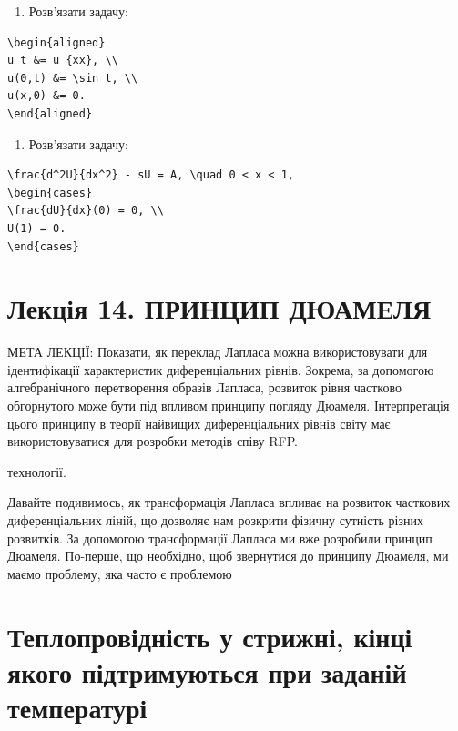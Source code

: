 \documentclass[
  ukrainian,
]{article}
\providecommand{\tightlist}{%
  \setlength{\itemsep}{0pt}\setlength{\parskip}{0pt}}
\begin{document}
\begin{enumerate}
\def\labelenumi{\arabic{enumi}.}
\setcounter{enumi}{2}
\tightlist
\item
  Розв'язати задачу:
\end{enumerate}

\begin{verbatim}
\begin{aligned}
u_t &= u_{xx}, \\
u(0,t) &= \sin t, \\
u(x,0) &= 0.
\end{aligned}
\end{verbatim}

\begin{enumerate}
\def\labelenumi{\arabic{enumi}.}
\setcounter{enumi}{3}
\tightlist
\item
  Розв'язати задачу:
\end{enumerate}

\begin{verbatim}
\frac{d^2U}{dx^2} - sU = A, \quad 0 < x < 1,
\begin{cases}
\frac{dU}{dx}(0) = 0, \\
U(1) = 0.
\end{cases}
\end{verbatim}

\section{Лекція 14. ПРИНЦИП
ДЮАМЕЛЯ}\label{ux43bux435ux43aux446ux456ux44f-14.-ux43fux440ux438ux43dux446ux438ux43f-ux434ux44eux430ux43cux435ux43bux44f}

МЕТА ЛЕКЦІЇ: Показати, як переклад Лапласа можна використовувати для
ідентифікації характеристик диференціальних рівнів. Зокрема, за
допомогою алгебранічного перетворення образів Лапласа, розвиток рівня
частково обгорнутого може бути під впливом принципу погляду Дюамеля.
Інтерпретація цього принципу в теорії найвищих диференціальних рівнів
світу має використовуватися для розробки методів співу RFP.

технології.

Давайте подивимось, як трансформація Лапласа впливає на розвиток
часткових диференціальних ліній, що дозволяє нам розкрити фізичну
сутність різних розвитків. За допомогою трансформації Лапласа ми вже
розробили принцип Дюамеля. По-перше, що необхідно, щоб звернутися до
принципу Дюамеля, ми маємо проблему, яка часто є проблемою

\section{Теплопровідність у стрижні, кінці якого підтримуються при
заданій
температурі}\label{ux442ux435ux43fux43bux43eux43fux440ux43eux432ux456ux434ux43dux456ux441ux442ux44c-ux443-ux441ux442ux440ux438ux436ux43dux456-ux43aux456ux43dux446ux456-ux44fux43aux43eux433ux43e-ux43fux456ux434ux442ux440ux438ux43cux443ux44eux442ux44cux441ux44f-ux43fux440ux438-ux437ux430ux434ux430ux43dux456ux439-ux442ux435ux43cux43fux435ux440ux430ux442ux443ux440ux456}
\end{document}
